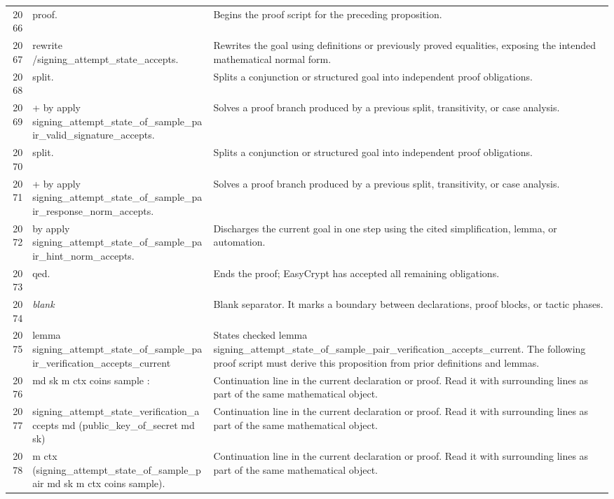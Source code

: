 \documentclass[10pt]{article}
\begin{document}
\begin{longtable}{r L{0.53\textwidth} L{0.37\textwidth}}
2066 & {\ttfamily\scriptsize proof.} & Begins the proof script for the preceding proposition. \\
2067 & {\ttfamily\scriptsize rewrite /signing\_attempt\_state\_accepts.} & Rewrites the goal using definitions or previously proved equalities, exposing the intended mathematical normal form. \\
2068 & {\ttfamily\scriptsize split.} & Splits a conjunction or structured goal into independent proof obligations. \\
2069 & {\ttfamily\scriptsize + by apply signing\_attempt\_state\_of\_sample\_pair\_valid\_signature\_accepts.} & Solves a proof branch produced by a previous split, transitivity, or case analysis. \\
2070 & {\ttfamily\scriptsize split.} & Splits a conjunction or structured goal into independent proof obligations. \\
2071 & {\ttfamily\scriptsize + by apply signing\_attempt\_state\_of\_sample\_pair\_response\_norm\_accepts.} & Solves a proof branch produced by a previous split, transitivity, or case analysis. \\
2072 & {\ttfamily\scriptsize by apply signing\_attempt\_state\_of\_sample\_pair\_hint\_norm\_accepts.} & Discharges the current goal in one step using the cited simplification, lemma, or automation. \\
2073 & {\ttfamily\scriptsize qed.} & Ends the proof; EasyCrypt has accepted all remaining obligations. \\
2074 & {\ttfamily\scriptsize \emph{blank}} & Blank separator.  It marks a boundary between declarations, proof blocks, or tactic phases. \\
2075 & {\ttfamily\scriptsize lemma signing\_attempt\_state\_of\_sample\_pair\_verification\_accepts\_current} & States checked lemma signing\_attempt\_state\_of\_sample\_pair\_verification\_accepts\_current.  The following proof script must derive this proposition from prior definitions and lemmas. \\
2076 & {\ttfamily\scriptsize    md sk m ctx coins sample :} & Continuation line in the current declaration or proof.  Read it with surrounding lines as part of the same mathematical object. \\
2077 & {\ttfamily\scriptsize   signing\_attempt\_state\_verification\_accepts md (public\_key\_of\_secret md sk)} & Continuation line in the current declaration or proof.  Read it with surrounding lines as part of the same mathematical object. \\
2078 & {\ttfamily\scriptsize     m ctx (signing\_attempt\_state\_of\_sample\_pair md sk m ctx coins sample).} & Continuation line in the current declaration or proof.  Read it with surrounding lines as part of the same mathematical object. \\

\end{longtable}
\end{document}
